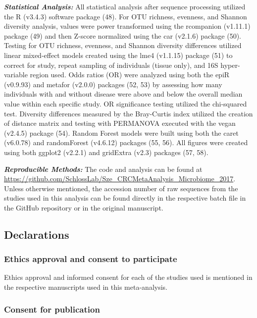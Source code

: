 \documentclass[12pt,]{article}
\begin{document}
\textbf{\emph{Statistical Analysis:}} All statistical analysis after
sequence processing utilized the R (v3.4.3) software package (48). For
OTU richness, evenness, and Shannon diversity analysis, values were
power transformed using the rcompanion (v1.11.1) package (49) and then
Z-score normalized using the car (v2.1.6) package (50). Testing for OTU
richness, evenness, and Shannon diversity differences utilized linear
mixed-effect models created using the lme4 (v1.1.15) package (51) to
correct for study, repeat sampling of individuals (tissue only), and 16S
hyper-variable region used. Odds ratios (OR) were analyzed using both
the epiR (v0.9.93) and metafor (v2.0.0) packages (52, 53) by assessing
how many individuals with and without disease were above and below the
overall median value within each specific study. OR significance testing
utilized the chi-squared test. Diversity differences measured by the
Bray-Curtis index utilized the creation of distance matrix and testing
with PERMANOVA executed with the vegan (v2.4.5) package (54). Random
Forest models were built using both the caret (v6.0.78) and randomForest
(v4.6.12) packages (55, 56). All figures were created using both ggplot2
(v2.2.1) and gridExtra (v2.3) packages (57, 58).

\textbf{\emph{Reproducible Methods:}} The code and analysis can be found
at
\url{https://github.com/SchlossLab/Sze_CRCMetaAnalysis_Microbiome_2017}.
Unless otherwise mentioned, the accession number of raw sequences from
the studies used in this analysis can be found directly in the
respective batch file in the GitHub repository or in the original
manuscript.

\newpage

\subsection{Declarations}\label{declarations}

\subsubsection{Ethics approval and consent to
participate}\label{ethics-approval-and-consent-to-participate}

Ethics approval and informed consent for each of the studies used is
mentioned in the respective manuscripts used in this meta-analysis.

\subsubsection{Consent for publication}\label{consent-for-publication}
\end{document}
